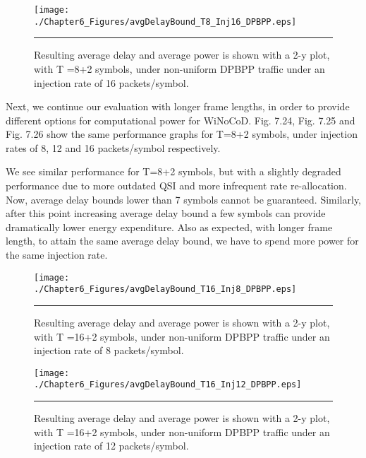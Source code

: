 \begin{figure}[t!]
  \centering
    \texttt{[image: ./Chapter6\_Figures/avgDelayBound\_T8\_Inj16\_DPBPP.eps]}
    \rule{35em}{0.5pt}
  \caption[Resulting average delay and average power is shown with a 2-y plot, with T =8+2 symbols, under non-uniform DPBPP traffic under an injection rate of 16 packets/symbol.]{Resulting average delay and average power is shown with a 2-y plot, with T =8+2 symbols, under non-uniform DPBPP traffic under an injection rate of 16 packets/symbol.} 
  \label{fig:Electron}
\end{figure}

Next, we continue our evaluation with longer frame lengths, in order to provide different options for computational power for WiNoCoD. Fig. 7.24, Fig. 7.25 and Fig. 7.26 show the same performance graphs for T=8+2 symbols, under injection rates of 8, 12 and 16 packets/symbol respectively.   


We see similar performance for T=8+2 symbols, but with a slightly degraded performance due to more outdated QSI and more infrequent rate re-allocation. Now, average delay bounds lower than 7 symbols cannot be guaranteed. Similarly, after this point increasing average delay bound a few symbols can provide dramatically lower energy expenditure. Also as expected, with longer frame length, to attain the same average delay bound, we have to spend more power for the same injection rate. 





\begin{figure}[b!]
  \centering
    \texttt{[image: ./Chapter6\_Figures/avgDelayBound\_T16\_Inj8\_DPBPP.eps]}
    \rule{35em}{0.5pt}
  \caption[Resulting average delay and average power is shown with a 2-y plot, with T =16+2 symbols, under non-uniform DPBPP traffic under an injection rate of 8 packets/symbol.]{Resulting average delay and average power is shown with a 2-y plot, with T =16+2 symbols, under non-uniform DPBPP traffic under an injection rate of 8 packets/symbol.} 
  \label{fig:Electron}
\end{figure}

\begin{figure}[H]
  \centering
    \texttt{[image: ./Chapter6\_Figures/avgDelayBound\_T16\_Inj12\_DPBPP.eps]}
    \rule{35em}{0.5pt}
  \caption[Resulting average delay and average power is shown with a 2-y plot, with T =16+2 symbols, under non-uniform DPBPP traffic under an injection rate of 8 packets/symbol.]{Resulting average delay and average power is shown with a 2-y plot, with T =16+2 symbols, under non-uniform DPBPP traffic under an injection rate of 12 packets/symbol.} 
  \label{fig:Electron}
\end{figure}

